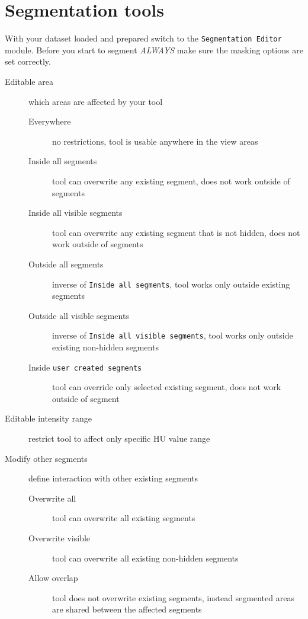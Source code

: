 \section{Segmentation tools}
With your dataset loaded and prepared switch to the \texttt{Segmentation Editor} module.
Before you start to segment \emph{ALWAYS} make sure the masking options are set correctly.
\begin{description}
	\item [Editable area] which areas are affected by your tool
	      \begin{description}
		      \item [Everywhere] no restrictions, tool is usable anywhere in the view areas
		      \item [Inside all segments] tool can overwrite any existing segment, does not work outside of segments
		      \item [Inside all visible segments] tool can overwrite any existing segment that is not hidden, does not work outside of segments
		      \item [Outside all segments] inverse of \texttt{Inside all segments}, tool works only outside existing segments
		      \item [Outside all visible segments] inverse of \texttt{Inside all visible segments}, tool works only outside existing non-hidden segments
		      \item [Inside \texttt{user created segments}] tool can override only selected existing segment, does not work outside of segment
	      \end{description}
	\item [Editable intensity range] restrict tool to affect only specific HU value range
	\item [Modify other segments] define interaction with other existing segments
	      \begin{description}
		      \item [Overwrite all] tool can overwrite all existing segments
		      \item [Overwrite visible] tool can overwrite all existing non-hidden segments
		      \item [Allow overlap] tool does not overwrite existing segments, instead segmented areas are shared between the affected segments
	      \end{description}
\end{description}
\pagebreak

